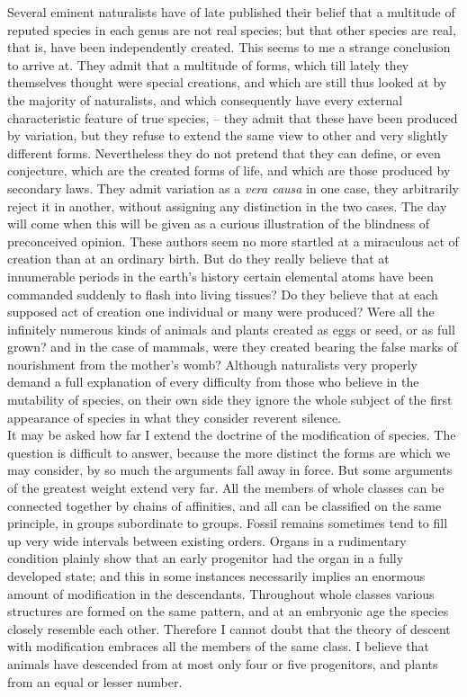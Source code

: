 \indent Several eminent naturalists have of late published their belief that a multitude of reputed species in each genus are not real species; but that other species are real, that is, have been independently created. This seems to me a strange conclusion to arrive at. They admit that a multitude of forms, which till lately they themselves thought were special creations, and which are still thus looked at by the majority of naturalists, and which consequently have every external characteristic feature of true species, -- they admit that these have been produced by variation, but they refuse to extend the same view to other and very slightly different forms.  Nevertheless they do not pretend that they can define, or even conjecture, which are the created forms of life, and which are those produced by secondary laws. They admit variation as a \emph{vera causa} in one case, they arbitrarily reject it in another, without assigning any distinction in the two cases. The day will come when this will be given as a curious illustration of the blindness of preconceived opinion. These authors seem no more startled at a miraculous act of creation than at an ordinary birth. But do they really believe that at innumerable periods in the earth's history certain elemental atoms have been commanded suddenly to flash into living tissues? Do they believe that at each supposed act of creation one individual or many were produced? Were all the infinitely numerous kinds of animals and plants created as eggs or seed, or as full grown?  and in the case of mammals, were they created bearing the false marks of nourishment from the mother's womb?  Although naturalists very properly demand a full explanation of every difficulty from those who believe in the mutability of species, on their own side they ignore the whole subject of the first appearance of species in what they consider reverent silence.~\\
\indent It may be asked how far I extend the doctrine of the modification of species. The question is difficult to answer, because the more distinct the forms are which we may consider, by so much the arguments fall away in force. But some arguments of the greatest weight extend very far. All the members of whole classes can be connected together by chains of affinities, and all can be classified on the same principle, in groups subordinate to groups. Fossil remains sometimes tend to fill up very wide intervals between existing orders.  Organs in a rudimentary condition plainly show that an early progenitor had the organ in a fully developed state; and this in some instances necessarily implies an enormous amount of modification in the descendants. Throughout whole classes various structures are formed on the same pattern, and at an embryonic age the species closely resemble each other. Therefore I cannot doubt that the theory of descent with modification embraces all the members of the same class. I believe that animals have descended from at most only four or five progenitors, and plants from an equal or lesser number.~\\
